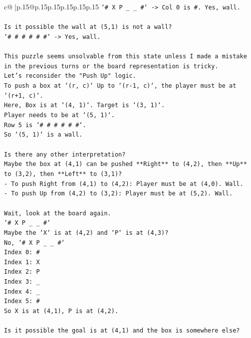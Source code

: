 \documentclass{article}
\begin{document}
{\begin{supertabular}{c@{$\;$}|p{.15\linewidth}@{}p{.15\linewidth}p{.15\linewidth}p{.15\linewidth}p{.15\linewidth}p{.15\linewidth}}
{{{\texttt{`\# X P \_ \_ \#` {-}> Col 0 is \#. Yes, wall.} \\
\\ 
\texttt{Is it possible the wall at (5,1) is not a wall?} \\
\texttt{`\# \# \# \# \# \#` {-}> Yes, wall.} \\
\\ 
\texttt{This puzzle seems unsolvable from this state unless I made a mistake in the previous turns or the board representation is tricky.} \\
\texttt{Let's reconsider the "Push Up" logic.} \\
\texttt{To push a box at `(r, c)` Up to `(r{-}1, c)`, the player must be at `(r+1, c)`.} \\
\texttt{Here, Box is at `(4, 1)`. Target is `(3, 1)`.} \\
\texttt{Player needs to be at `(5, 1)`.} \\
\texttt{Row 5 is `\# \# \# \# \# \#`.} \\
\texttt{So `(5, 1)` is a wall.} \\
\\ 
\texttt{Is there any other interpretation?} \\
\texttt{Maybe the box at (4,1) can be pushed **Right** to (4,2), then **Up** to (3,2), then **Left** to (3,1)?} \\
\texttt{{-} To push Right from (4,1) to (4,2): Player must be at (4,0). Wall.} \\
\texttt{{-} To push Up from (4,2) to (3,2): Player must be at (5,2). Wall.} \\
\\ 
\texttt{Wait, look at the board again.} \\
\texttt{`\# X P \_ \_ \#`} \\
\texttt{Maybe the `X` is at (4,2) and `P` is at (4,3)?} \\
\texttt{No, `\# X P \_ \_ \#`} \\
\texttt{Index 0: \#} \\
\texttt{Index 1: X} \\
\texttt{Index 2: P} \\
\texttt{Index 3: \_} \\
\texttt{Index 4: \_} \\
\texttt{Index 5: \#} \\
\texttt{So X is at (4,1), P is at (4,2).} \\
\\ 
\texttt{Is it possible the goal is at (4,1) and the box is somewhere else?} \\
}}}
\end{supertabular}}
\end{document}
